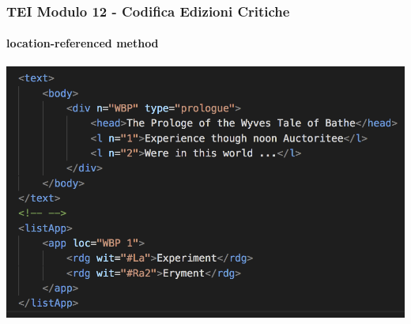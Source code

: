 \begin{frame}
    \frametitle{TEI Modulo 12 - Codifica Edizioni Critiche}
    \framesubtitle{location-referenced method}
    \addtocounter{nframe}{1}
    
    





    \begin{center}
       \includegraphics[width=.95\textwidth]{imgs/location-referenced.png}
    \end{center}

\end{frame}


